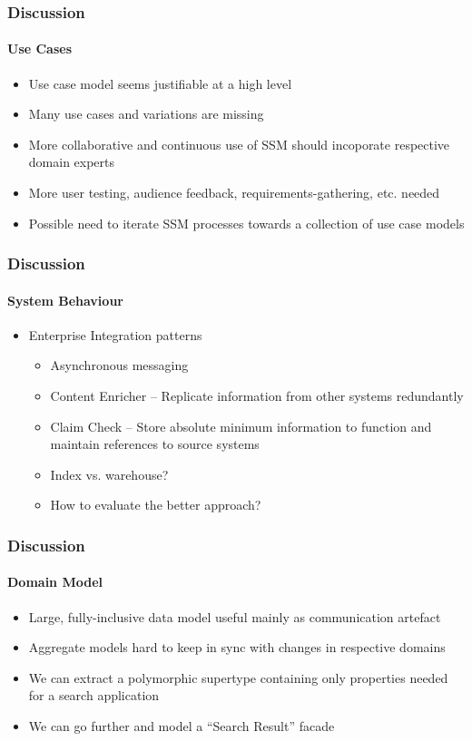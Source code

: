 \documentclass{beamer}
\begin{document}
\begin{frame}
  \frametitle{Discussion}
  \framesubtitle{Use Cases}
  \begin{itemize}
    \pause \item Use case model seems justifiable at a high level
    \pause \item Many use cases and variations are missing
    \pause \item More collaborative and continuous use of SSM should incoporate respective domain experts
    \pause \item More user testing, audience feedback, requirements-gathering, etc. needed
    \pause \item Possible need to iterate SSM processes towards a collection of use case models
  \end{itemize}
\end{frame}

\begin{frame}
  \frametitle{Discussion}
  \framesubtitle{System Behaviour}
  \begin{itemize}
    \pause \item Enterprise Integration patterns
    \begin{itemize}
      \pause \item Asynchronous messaging
      \pause \item Content Enricher -- Replicate information from other systems redundantly
      \pause \item Claim Check -- Store absolute minimum information to function and maintain references to source systems
      \pause \item Index vs. warehouse?
      \pause \item How to evaluate the better approach?
    \end{itemize}
  \end{itemize}
\end{frame}

\begin{frame}
  \frametitle{Discussion}
  \framesubtitle{Domain Model}
  \begin{itemize}
    \pause \item Large, fully-inclusive data model useful mainly as communication artefact
    \pause \item Aggregate models hard to keep in sync with changes in respective domains
    \pause \item We can extract a polymorphic supertype containing only properties needed for a search application
    \pause \item We can go further and model a ``Search Result'' facade
  \end{itemize}
\end{frame}
\end{document}

